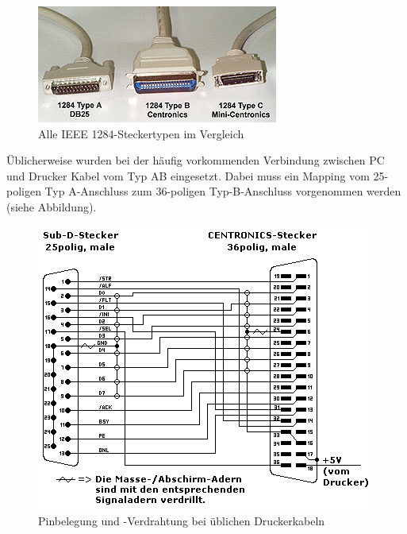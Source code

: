 \documentclass[a4paper,11pt]{article}
\begin{document}
\begin{figure}[h]
 \centering
 \includegraphics{./pics/ieee1284_types.jpg}
	\caption{Alle IEEE 1284-Steckertypen im Vergleich} 	
\end{figure}


Üblicherweise wurden bei der häufig vorkommenden Verbindung zwischen PC und Drucker Kabel vom Typ AB eingesetzt. Dabei muss ein Mapping vom 25-poligen Typ A-Anschluss zum 36-poligen Typ-B-Anschluss vorgenommen werden (siehe Abbildung).  


\begin{figure}[h]
 \centering
 \includegraphics[scale=0.7]{./pics/ieee1284_pinbelegungAB.png}
	\caption{Pinbelegung und -Verdrahtung bei üblichen Druckerkabeln} 	
\end{figure} 
\end{document}
